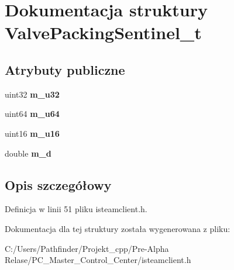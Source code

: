 \hypertarget{struct_valve_packing_sentinel__t}{}\section{Dokumentacja struktury Valve\+Packing\+Sentinel\+\_\+t}
\label{struct_valve_packing_sentinel__t}
\subsection*{Atrybuty publiczne}
\begin{DoxyCompactItemize}
\item 
\mbox{\label{struct_valve_packing_sentinel__t_ab819aaafb3580dd23b3222b1c5056248}} 
uint32 {\bfseries m\+\_\+u32}
\item 
\mbox{\label{struct_valve_packing_sentinel__t_acb1beb7a7b8fe0801493ae8f5f3b79e4}} 
uint64 {\bfseries m\+\_\+u64}
\item 
\mbox{\label{struct_valve_packing_sentinel__t_ada6ef77e510a74821bed3ae0a089affa}} 
uint16 {\bfseries m\+\_\+u16}
\item 
\mbox{\label{struct_valve_packing_sentinel__t_a6455d7b7d81dde6582fe654baa417da8}} 
double {\bfseries m\+\_\+d}
\end{DoxyCompactItemize}


\subsection{Opis szczegółowy}


Definicja w linii 51 pliku isteamclient.\+h.



Dokumentacja dla tej struktury została wygenerowana z pliku\+:\begin{DoxyCompactItemize}
\item 
C\+:/\+Users/\+Pathfinder/\+Projekt\+\_\+cpp/\+Pre-\/\+Alpha Relase/\+P\+C\+\_\+\+Master\+\_\+\+Control\+\_\+\+Center/isteamclient.\+h\end{DoxyCompactItemize}
